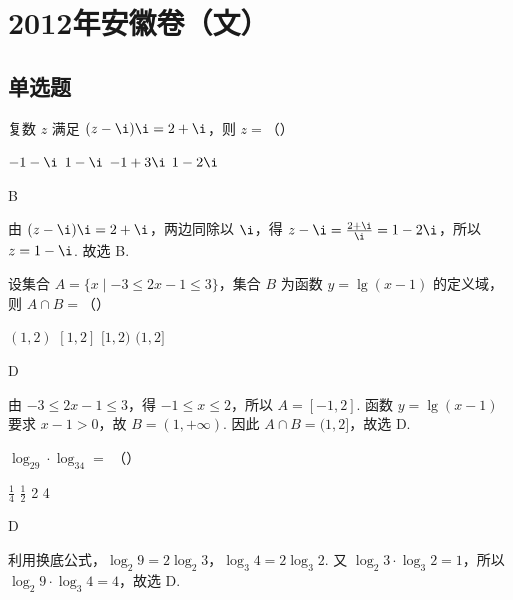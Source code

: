 \chapter{2012年安徽卷（文）}

\section{单选题}

\begin{problem}
复数 \(z\) 满足 \((z - \i)\i = 2 + \i\)，则 \(z =\)（\quad）

\choices
    {\(-1 - \i\)}
    {\(1 - \i\)}
    {\(-1 + 3\i\)}
    {\(1 - 2\i\)}
\end{problem}

\begin{answer}
B
\end{answer}

\begin{solution}
由 \((z-\i)\i=2+\i\)，两边同除以 \(\i\)，得 \(z-\i=\frac{2+\i}{\i}=1-2\i\)，所以 \(z=1-\i\). 故选 B.
\end{solution}

\begin{problem}
设集合 \(A = \{x \mid -3 \leqslant 2x - 1 \leqslant 3\}\)，集合 \(B\) 为函数 \(y = \lg (x - 1)\) 的定义域，则 \(A \cap B =\)（\quad）

\choices
    {\((1, 2)\)}
    {\([1, 2]\)}
    {\([1,2)\)}
    {\((1,2]\)}
\end{problem}

\begin{answer}
D
\end{answer}

\begin{solution}
由 \(-3\leqslant 2x-1\leqslant 3\)，得 \(-1\leqslant x\leqslant 2\)，所以 \(A=[-1,2]\). 函数 \(y=\lg(x-1)\) 要求 \(x-1>0\)，故 \(B=(1,+\infty)\). 因此 \(A\cap B=(1,2]\)，故选 D.
\end{solution}

\begin{problem}
\(\log_29\cdot \log_34 =\) （\quad）

\choices
    {\(\frac{1}{4}\)}
    {\(\frac{1}{2}\)}
    {2}
    {4}
\end{problem}

\begin{answer}
D
\end{answer}

\begin{solution}
利用换底公式，\(\log_2 9=2\log_2 3\)，\(\log_3 4=2\log_3 2\). 又 \(\log_2 3\cdot\log_3 2=1\)，所以 \(\log_2 9\cdot\log_3 4=4\)，故选 D.
\end{solution}

